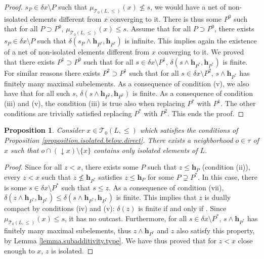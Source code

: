 \documentclass{article}
\newtheorem{proposition}[theorem]{Proposition}
\begin{document}
\begin{proof}
$s_P \in \delta x \setminus P$ such that  $\mu_{\mathcal{T}_0(L,\le)}(x) \not \le s$, we would have 
a net of non-isolated elements different from $x$ converging to it. There is thus some $P^{0}$ 
such that for all $P \supset P^{0}$, $\mu_{\mathcal{T}_0(L,\le)}(x) \le s$. Assume that 
for all $P \supset P^{0}$, there exists $s_P \in \delta x \setminus P$ such that $\delta(s_P \wedge \boldsymbol{h}_{P^*},\boldsymbol{h}_{P^*})$ is infinite. This implies again the existence of a net of non-isolated elements different from $x$ converging to it.
We proved that there exists $P^{1} \supset P^0$ such that for all $s \in \delta x \setminus P^1$, $\delta(s \wedge \boldsymbol{h}_{P^*},\boldsymbol{h}_{P^*})$ is finite. For similar reasons there exists $P^2 \supset P^1$ such that for all $s \in \delta x \setminus P^2$, 
$s \wedge \boldsymbol{h}_{P^*}$ has finitely many maximal subelements. As a consequence of condition (v), we also have that for all such $s$, 
$\delta(s \wedge \boldsymbol{h}_{P^2},\boldsymbol{h}_{P^2})$ is finite. 
As a consequence of condition (iii) and (v), the condition (iii) is true also when replacing $P^*$ with $P^1$. The other conditions are trivially satisfied replacing $P^*$ with $P^2$. This ends the proof.
\end{proof}


\begin{proposition}\label{proposition.reverse.isolated.below.1}
    Consider $x \in \mathcal{T}_0(L,\le)$ 
    which satisfies the conditions of Proposition \ref{proposition.isolated.below.direct}. There exists a neighborhood $o \in \tau$ of $x$ such that 
    $o \cap (\mathop{\downarrow}x) \setminus \{x\}$ contains only isolated elements of $L$. 
\end{proposition}

\begin{proof}
    Since for all $z < x$, there exists some $P$ such that $z \le \boldsymbol{h}_P$ (condition (ii)),
    every $z < x$ such that $z \not \le \boldsymbol{h}_{P^*}$ satisfies $z \le \boldsymbol{h}_{P}$ for some $P \supsetneq P^*$. 
    In this case, there is some $s \in \delta x \setminus P^*$ such that $s \le z$. As a consequence 
    of condition (vii), $\delta(z \wedge \boldsymbol{h}_{P^*},\boldsymbol{h}_{P^*}) \le \delta(s \wedge \boldsymbol{h}_{P^*},\boldsymbol{h}_{P^*})$ is finite. This implies that $z$ is dually compact by conditions (iv) and (v): $\delta(z)$ is finite if and only if . 
    Since $\mu_{\mathcal{T}_0(L,\le)}(x) \le s$, it has no outcast. Furthermore, for all $s \in \delta x \setminus P^*$, $s \wedge \boldsymbol{h}_{P^*}$ has finitely many maximal subelements, thus $z\wedge \boldsymbol{h}_{P^*}$ and $z$ also satisfy this property, by Lemma \ref{lemma.subadditivity.type}. We have thus proved that for $z < x$ close enough to $x$, $z$ is isolated.
\end{proof}
\end{document}
